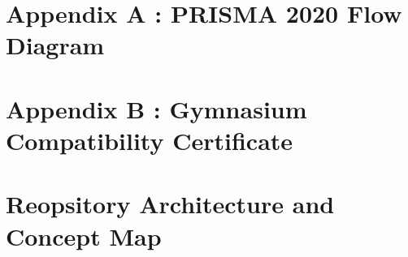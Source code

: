 \documentclass[11pt,a4paper]{article}
\theoremstyle{definition}
\theoremstyle{remark}
\begin{document}
\section{Appendix A : PRISMA 2020 Flow Diagram}
\label{app:prisma}

\FloatBarrier


\section{Appendix B : Gymnasium Compatibility Certificate}
\label{app:gym_certificate}

\FloatBarrier

\section{Reopsitory Architecture and Concept Map}
\label{app:repo_map}

\end{document}
